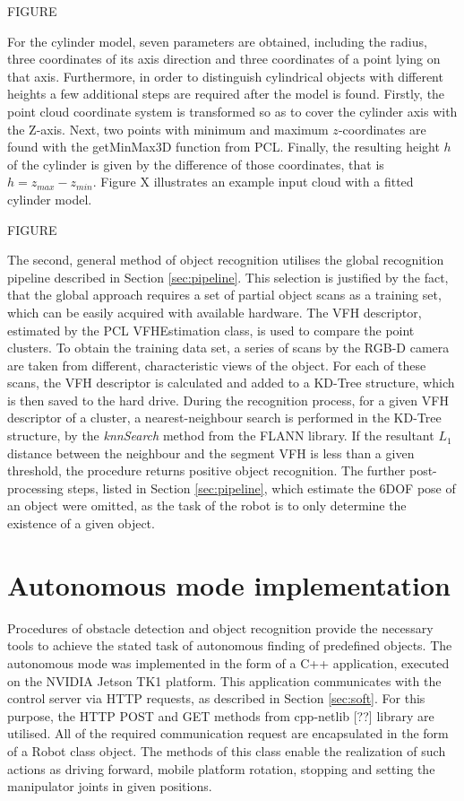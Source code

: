 FIGURE

For the cylinder model, seven parameters are obtained, including the radius, three coordinates of its axis direction and three coordinates of a point lying on that axis. Furthermore, in order to distinguish cylindrical objects with different heights a few additional steps are required after the model is found. Firstly, the point cloud coordinate system is transformed so as to cover the cylinder axis with the Z-axis. Next, two points with minimum and maximum $z$-coordinates are found with the getMinMax3D function from PCL. Finally, the resulting height $h$ of the cylinder is given by the difference of those coordinates, that is $h = z_{max} - z_{min}$. Figure X illustrates an example input cloud with a fitted cylinder model.

FIGURE

The second, general method of object recognition utilises the global recognition pipeline described in Section \ref{sec:pipeline}. This selection is justified by the fact, that the global approach requires a set of partial object scans as a training set, which can be easily acquired with available hardware. The VFH descriptor, estimated by the PCL VFHEstimation class, is used to compare the point clusters. To obtain the training data set, a series of scans by the RGB-D camera are taken from different, characteristic views of the object. For each of these scans, the VFH descriptor is calculated and added to a KD-Tree structure, which is then saved to the hard drive. During the recognition process, for a given VFH descriptor of a cluster, a nearest-neighbour search is performed in the KD-Tree structure, by the \textit{knnSearch} method from the FLANN library. If the resultant $L_1$ distance between the neighbour and the segment VFH is less than a given threshold, the procedure returns positive object recognition. The further post-processing steps, listed in Section \ref{sec:pipeline}, which estimate the 6DOF pose of an object were omitted, as the task of the robot is to only determine the existence of a given object.


\section{Autonomous mode implementation}
\label{sec:autonomy}

Procedures of obstacle detection and object recognition provide the necessary tools to achieve the stated task of autonomous finding of predefined objects. The autonomous mode was implemented in the form of a C++ application, executed on the NVIDIA Jetson TK1 platform. This application communicates with the control server via HTTP requests, as described in Section \ref{sec:soft}. For this purpose, the HTTP POST and GET methods from cpp-netlib [??] library are utilised. All of the required communication request are encapsulated in the form of a Robot class object. The methods of this class enable the realization of such actions as driving forward, mobile platform rotation, stopping and setting the manipulator joints in given positions. 

